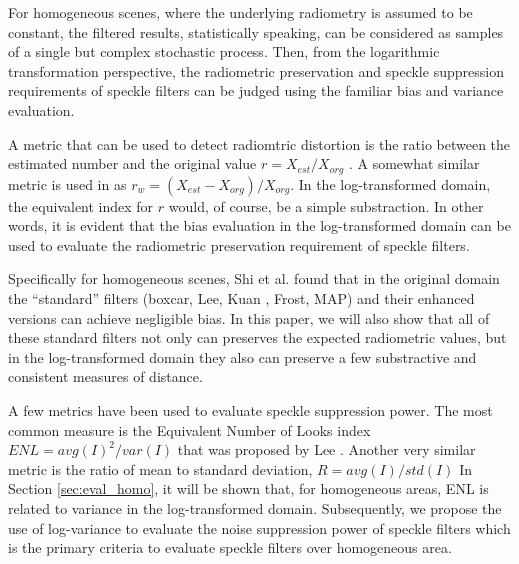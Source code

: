 \documentclass[journal]{IEEEtran}
\begin{document}
For homogeneous scenes, 
	where the underlying radiometry is assumed to be constant, 
	the filtered results, statistically speaking, can be considered as samples of 
		a single but complex stochastic process.
Then, from the logarithmic transformation perspective, the radiometric preservation and speckle suppression requirements of speckle filters can be judged using the familiar bias and variance evaluation.

A metric that can be used to detect radiomtric distortion is the ratio between the estimated number and the original value $r = X_{est} / X_{org}$ \cite{Oliver_2004_SciTech} \cite{Medeiros_2003_IJRS}.
A somewhat similar metric is used in \cite{Wang_2005_MIPR} as $r_w = (X_{est} - X_{org} )/ X_{org}$.
In the log-transformed domain, the equivalent index for $r$ would, of course, be a simple substraction.
In other words, it is evident that the bias evaluation in the log-transformed domain can be used to evaluate the radiometric preservation requirement of speckle filters. 

Specifically for homogeneous scenes, Shi et al. \cite{Shi_IGARSS_1994} found that 
	in the original domain the ``standard'' filters (boxcar, Lee\cite{Lee_PAMI_1980}, Kuan \cite{Kuan_1985_PAMI}, Frost\cite{Frost_PAMI_1982}, MAP\cite{Lopes_IGARSS_1990}) and their enhanced versions \cite{Lopes_TGRS_1990} can achieve negligible bias. 
In this paper, we will also show that all of these standard filters 
	not only can preserves the expected radiometric values, 
	but in the log-transformed domain they also can preserve a few substractive and consistent measures of distance.

A few metrics have been used to evaluate speckle suppression power.
The most common measure is the Equivalent Number of Looks index 
$ENL=avg(I)^2/var(I)$
that was proposed by Lee \cite{Lee_1981_CGIP}.
Another very similar metric is the ratio of mean to standard deviation, $R=avg(I)/std(I)$ \cite{Gagnon_SPIEProc_1997} 
In Section \ref{sec:eval_homo}, it will be shown that, for homogeneous areas, ENL is related to variance in the log-transformed domain.
Subsequently, we propose the use of log-variance to evaluate the noise suppression power of speckle filters which is the primary criteria to evaluate speckle filters over homogeneous area.
\end{document}
